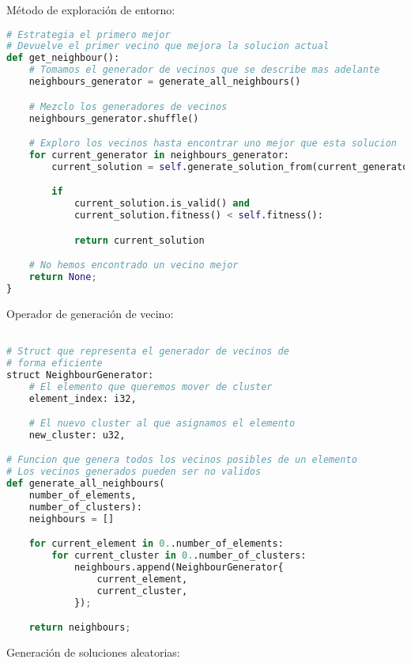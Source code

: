 \documentclass[11pt]{article}
\begin{document}
Método de exploración de entorno:

\begin{lstlisting}[language=Python, style=Boxed]
# Estrategia el primero mejor
# Devuelve el primer vecino que mejora la solucion actual
def get_neighbour():
    # Tomamos el generador de vecinos que se describe mas adelante
    neighbours_generator = generate_all_neighbours()

    # Mezclo los generadores de vecinos
    neighbours_generator.shuffle()

    # Exploro los vecinos hasta encontrar uno mejor que esta solucion
    for current_generator in neighbours_generator:
        current_solution = self.generate_solution_from(current_generator)

        if
            current_solution.is_valid() and
            current_solution.fitness() < self.fitness():

            return current_solution

    # No hemos encontrado un vecino mejor
    return None;
}
\end{lstlisting}

Operador de generación de vecino:

\begin{lstlisting}[language=Python, style=Boxed]

# Struct que representa el generador de vecinos de
# forma eficiente
struct NeighbourGenerator:
    # El elemento que queremos mover de cluster
    element_index: i32,

    # El nuevo cluster al que asignamos el elemento
    new_cluster: u32,

# Funcion que genera todos los vecinos posibles de un elemento
# Los vecinos generados pueden ser no validos
def generate_all_neighbours(
    number_of_elements,
    number_of_clusters):
    neighbours = []

    for current_element in 0..number_of_elements:
        for current_cluster in 0..number_of_clusters:
            neighbours.append(NeighbourGenerator{
                current_element,
                current_cluster,
            });

    return neighbours;
\end{lstlisting}

Generación de soluciones aleatorias:
\end{document}
